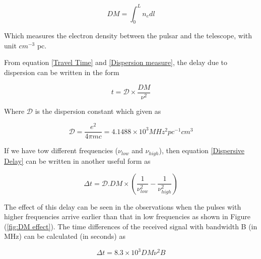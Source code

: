\begin{equation}
\label{Dispersion measure}
DM =  \int_0^L n_e dl
\end{equation}

Which measures the electron density between the pulsar and the telescope, with unit $ cm^{-3}$ pc.

From equation \ref{Travel Time} and \ref{Dispersion measure}, the delay due to dispersion can be written in the form 

\begin{equation}
\label{Dispersive Delay}
t =  \mathcal{D} \times \frac{DM}{\nu^2}
\end{equation}

Where $\mathcal{D}$ is the dispersion constant which given as 

\begin{equation}
\label{Dispersion Constant}
\mathcal{D}  = \frac{e^2}{4 \pi mc} = 4.1488 \times 10^{3} MHz^{2} pc^{-1
}cm^3
\end{equation}

If we have tow different frequencies ($\nu_{low}$ and $\nu_{high}$), then equation \ref{Dispersive Delay} can be written in another useful form as

\begin{equation}
\label{Dispersive Delay of two freq}
\Delta t =  \mathcal{D}.DM \times \left(\frac{1}{\nu^2_{low} } - \frac{1}{\nu^2_{high} } \right)
\end{equation}

The effect of this delay can be seen in the observations when the pulses with higher frequencies arrive earlier than that in low frequencies as shown in Figure (\ref{fig:DM effect}). The time differences of the received signal with bandwidth B (in MHz) can be calculated (in seconds) as

\begin{equation}
\label{Disp}
\Delta t =  8.3 \times 10^3 DM \nu^2 B 
\end{equation}


